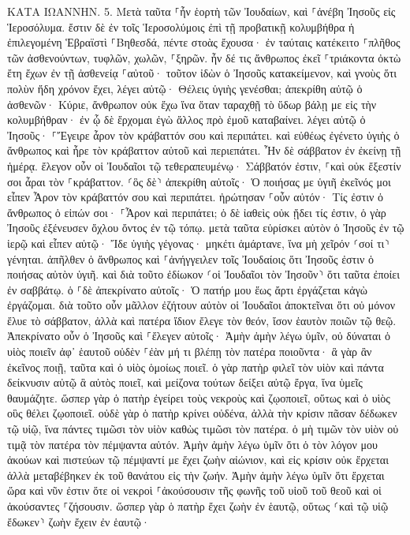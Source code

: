 \documentclass[twoside, 9pt]{extreport}
\begin{document}
ΚΑΤΑ ΙΩΑΝΝΗΝ.
5.
Μετὰ ταῦτα ⸀ἦν ἑορτὴ τῶν Ἰουδαίων, καὶ ⸀ἀνέβη Ἰησοῦς εἰς Ἱεροσόλυμα. 
ἔστιν δὲ ἐν τοῖς Ἱεροσολύμοις ἐπὶ τῇ προβατικῇ κολυμβήθρα ἡ ἐπιλεγομένη Ἑβραϊστὶ ⸀Βηθεσδά, πέντε στοὰς ἔχουσα· 
ἐν ταύταις κατέκειτο ⸀πλῆθος τῶν ἀσθενούντων, τυφλῶν, χωλῶν, ⸀ξηρῶν. 
ἦν δέ τις ἄνθρωπος ἐκεῖ ⸀τριάκοντα ὀκτὼ ἔτη ἔχων ἐν τῇ ἀσθενείᾳ ⸀αὐτοῦ· 
τοῦτον ἰδὼν ὁ Ἰησοῦς κατακείμενον, καὶ γνοὺς ὅτι πολὺν ἤδη χρόνον ἔχει, λέγει αὐτῷ· Θέλεις ὑγιὴς γενέσθαι; 
ἀπεκρίθη αὐτῷ ὁ ἀσθενῶν· Κύριε, ἄνθρωπον οὐκ ἔχω ἵνα ὅταν ταραχθῇ τὸ ὕδωρ βάλῃ με εἰς τὴν κολυμβήθραν· ἐν ᾧ δὲ ἔρχομαι ἐγὼ ἄλλος πρὸ ἐμοῦ καταβαίνει. 
λέγει αὐτῷ ὁ Ἰησοῦς· ⸀Ἔγειρε ἆρον τὸν κράβαττόν σου καὶ περιπάτει. 
καὶ εὐθέως ἐγένετο ὑγιὴς ὁ ἄνθρωπος καὶ ἦρε τὸν κράβαττον αὐτοῦ καὶ περιεπάτει. Ἦν δὲ σάββατον ἐν ἐκείνῃ τῇ ἡμέρᾳ. 
ἔλεγον οὖν οἱ Ἰουδαῖοι τῷ τεθεραπευμένῳ· Σάββατόν ἐστιν, ⸀καὶ οὐκ ἔξεστίν σοι ἆραι τὸν ⸀κράβαττον. 
⸂ὃς δὲ⸃ ἀπεκρίθη αὐτοῖς· Ὁ ποιήσας με ὑγιῆ ἐκεῖνός μοι εἶπεν Ἆρον τὸν κράβαττόν σου καὶ περιπάτει. 
ἠρώτησαν ⸀οὖν αὐτόν· Τίς ἐστιν ὁ ἄνθρωπος ὁ εἰπών σοι· ⸀Ἆρον καὶ περιπάτει; 
ὁ δὲ ἰαθεὶς οὐκ ᾔδει τίς ἐστιν, ὁ γὰρ Ἰησοῦς ἐξένευσεν ὄχλου ὄντος ἐν τῷ τόπῳ. 
μετὰ ταῦτα εὑρίσκει αὐτὸν ὁ Ἰησοῦς ἐν τῷ ἱερῷ καὶ εἶπεν αὐτῷ· Ἴδε ὑγιὴς γέγονας· μηκέτι ἁμάρτανε, ἵνα μὴ χεῖρόν ⸂σοί τι⸃ γένηται. 
ἀπῆλθεν ὁ ἄνθρωπος καὶ ⸀ἀνήγγειλεν τοῖς Ἰουδαίοις ὅτι Ἰησοῦς ἐστιν ὁ ποιήσας αὐτὸν ὑγιῆ. 
καὶ διὰ τοῦτο ἐδίωκον ⸂οἱ Ἰουδαῖοι τὸν Ἰησοῦν⸃ ὅτι ταῦτα ἐποίει ἐν σαββάτῳ. 
ὁ ⸀δὲ ἀπεκρίνατο αὐτοῖς· Ὁ πατήρ μου ἕως ἄρτι ἐργάζεται κἀγὼ ἐργάζομαι. 
διὰ τοῦτο οὖν μᾶλλον ἐζήτουν αὐτὸν οἱ Ἰουδαῖοι ἀποκτεῖναι ὅτι οὐ μόνον ἔλυε τὸ σάββατον, ἀλλὰ καὶ πατέρα ἴδιον ἔλεγε τὸν θεόν, ἴσον ἑαυτὸν ποιῶν τῷ θεῷ. 
Ἀπεκρίνατο οὖν ὁ Ἰησοῦς καὶ ⸀ἔλεγεν αὐτοῖς· Ἀμὴν ἀμὴν λέγω ὑμῖν, οὐ δύναται ὁ υἱὸς ποιεῖν ἀφ᾽ ἑαυτοῦ οὐδὲν ⸀ἐὰν μή τι βλέπῃ τὸν πατέρα ποιοῦντα· ἃ γὰρ ἂν ἐκεῖνος ποιῇ, ταῦτα καὶ ὁ υἱὸς ὁμοίως ποιεῖ. 
ὁ γὰρ πατὴρ φιλεῖ τὸν υἱὸν καὶ πάντα δείκνυσιν αὐτῷ ἃ αὐτὸς ποιεῖ, καὶ μείζονα τούτων δείξει αὐτῷ ἔργα, ἵνα ὑμεῖς θαυμάζητε. 
ὥσπερ γὰρ ὁ πατὴρ ἐγείρει τοὺς νεκροὺς καὶ ζῳοποιεῖ, οὕτως καὶ ὁ υἱὸς οὓς θέλει ζῳοποιεῖ. 
οὐδὲ γὰρ ὁ πατὴρ κρίνει οὐδένα, ἀλλὰ τὴν κρίσιν πᾶσαν δέδωκεν τῷ υἱῷ, 
ἵνα πάντες τιμῶσι τὸν υἱὸν καθὼς τιμῶσι τὸν πατέρα. ὁ μὴ τιμῶν τὸν υἱὸν οὐ τιμᾷ τὸν πατέρα τὸν πέμψαντα αὐτόν. 
Ἀμὴν ἀμὴν λέγω ὑμῖν ὅτι ὁ τὸν λόγον μου ἀκούων καὶ πιστεύων τῷ πέμψαντί με ἔχει ζωὴν αἰώνιον, καὶ εἰς κρίσιν οὐκ ἔρχεται ἀλλὰ μεταβέβηκεν ἐκ τοῦ θανάτου εἰς τὴν ζωήν. 
Ἀμὴν ἀμὴν λέγω ὑμῖν ὅτι ἔρχεται ὥρα καὶ νῦν ἐστιν ὅτε οἱ νεκροὶ ⸀ἀκούσουσιν τῆς φωνῆς τοῦ υἱοῦ τοῦ θεοῦ καὶ οἱ ἀκούσαντες ⸀ζήσουσιν. 
ὥσπερ γὰρ ὁ πατὴρ ἔχει ζωὴν ἐν ἑαυτῷ, οὕτως ⸂καὶ τῷ υἱῷ ἔδωκεν⸃ ζωὴν ἔχειν ἐν ἑαυτῷ· 
\end{document}
